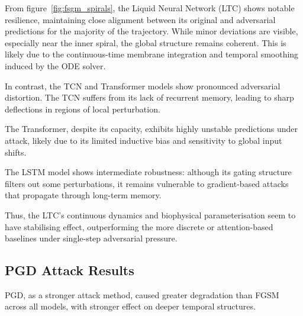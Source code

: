 From figure~\ref{fig:fsgm_spirals}, the Liquid Neural Network (LTC) shows notable resilience, maintaining close alignment between its original and adversarial predictions for the majority of the trajectory. While minor deviations are visible, especially near the inner spiral, the global structure remains coherent. This is likely due to the continuous-time membrane integration and temporal smoothing induced by the ODE solver.

In contrast, the TCN and Transformer models show pronounced adversarial distortion. The TCN suffers from its lack of recurrent memory, leading to sharp deflections in regions of local perturbation.

The Transformer, despite its capacity, exhibits highly unstable predictions under attack, likely due to its limited inductive bias and sensitivity to global input shifts.

The LSTM model shows intermediate robustness: although its gating structure filters out some perturbations, it remains vulnerable to gradient-based attacks that propagate through long-term memory.

Thus, the LTC's continuous dynamics and biophysical parameterisation seem to have stabilising effect, outperforming the more discrete or attention-based baselines under single-step adversarial pressure.

\subsection*{PGD Attack Results}

PGD, as a stronger attack method, caused greater degradation than FGSM across all models, with stronger effect on deeper temporal structures.


